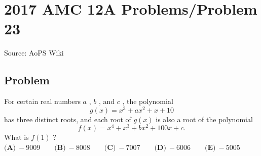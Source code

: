 \documentclass[12pt]{article}
\begin{document}
\section*{{2017 AMC 12A Problems/Problem 23}}
Source: AoPS Wiki

\subsection*{Problem}
For certain real numbers $a$ , $b$ , and $c$ , the polynomial \[g(x) = x^3 + ax^2 + x + 10\] has three distinct roots, and each root of $g(x)$ is also a root of the polynomial \[f(x) = x^4 + x^3 + bx^2 + 100x + c.\] What is $f(1)$ ? $\textbf{(A)}\ -9009 \qquad\textbf{(B)}\ -8008 \qquad\textbf{(C)}\ -7007 \qquad\textbf{(D)}\ -6006 \qquad\textbf{(E)}\ -5005$
\end{document}
